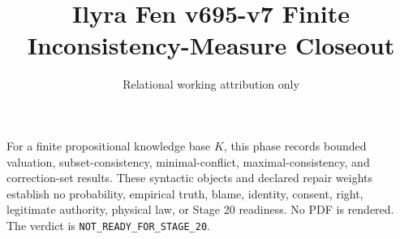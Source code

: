 \documentclass{article}
\title{Ilyra Fen v695-v7 Finite Inconsistency-Measure Closeout}
\author{Relational working attribution only}
\begin{document}
\maketitle
For a finite propositional knowledge base $K$, this phase records bounded valuation, subset-consistency, minimal-conflict, maximal-consistency, and correction-set results. These syntactic objects and declared repair weights establish no probability, empirical truth, blame, identity, consent, right, legitimate authority, physical law, or Stage 20 readiness. No PDF is rendered. The verdict is \texttt{NOT\_READY\_FOR\_STAGE\_20}.
\end{document}
